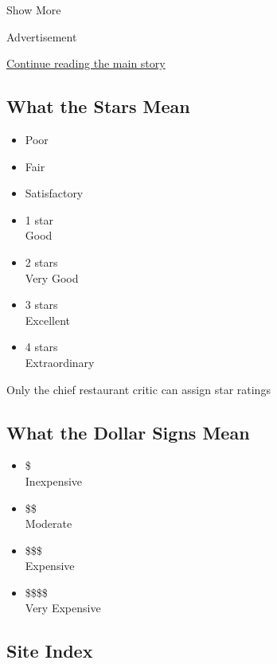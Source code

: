 Show More

Advertisement

\protect\hyperlink{after-mid1}{Continue reading the main story}

\hypertarget{what-the-stars-mean}{%
\subsection{What the Stars Mean}\label{what-the-stars-mean}}

\begin{itemize}
\tightlist
\item
  Poor\\
  \hspace*{0.333em}
\item
  Fair\\
  \hspace*{0.333em}
\item
  Satisfactory\\
  \hspace*{0.333em}
\item
  1 star\\
  Good
\item
  2 stars\\
  Very Good
\item
  3 stars\\
  Excellent
\item
  4 stars\\
  Extraordinary
\end{itemize}

Only the chief restaurant critic can assign star ratings

\hypertarget{what-the-dollar-signs-mean}{%
\subsection{What the Dollar Signs
Mean}\label{what-the-dollar-signs-mean}}

\begin{itemize}
\tightlist
\item
  \$\\
  Inexpensive
\item
  \$\$\\
  Moderate
\item
  \$\$\$\\
  Expensive
\item
  \$\$\$\$\\
  Very Expensive
\end{itemize}

\hypertarget{site-index}{%
\subsection{Site Index}\label{site-index}}

